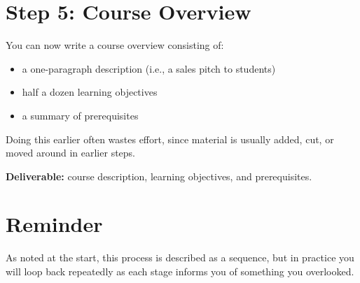 \section*{Step 5: Course Overview}

You can now write a course overview consisting of:

\begin{itemize}
\item
  a one-paragraph description (i.e., a sales pitch to students)
\item
  half a dozen learning objectives
\item
  a summary of prerequisites
\end{itemize}

Doing this earlier often wastes effort, since material is usually added,
cut, or moved around in earlier steps.

\textbf{Deliverable:} course description, learning objectives, and
prerequisites.

\section*{Reminder}

As noted at the start, this process is described as a sequence, but in
practice you will loop back repeatedly as each stage informs you of
something you overlooked.
